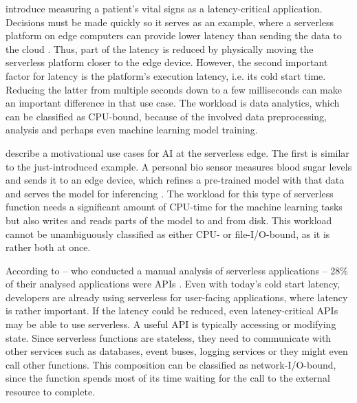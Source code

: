 \begin{description}[style=multiline, leftmargin=2.5cm, font=\bfseries]

    \item[Vital Signs Analysis] \citeauthor{Nastic2017} introduce measuring a patient's vital signs as a latency-critical application. Decisions must be made quickly so it serves as an example, where a serverless platform on edge computers can provide lower latency than sending the data to the cloud \cite{Nastic2017}. Thus, part of the latency is reduced by physically moving the serverless platform closer to the edge device. However, the second important factor for latency is the platform's execution latency, i.e. its cold start time. Reducing the latter from multiple seconds down to a few milliseconds can make an important difference in that use case. The workload is data analytics, which can be classified as CPU-bound, because of the involved data preprocessing, analysis and perhaps even machine learning model training.
    \item[Edge AI] \citeauthor{Rausch2019} describe a motivational use cases for AI at the serverless edge. The first is similar to the just-introduced example. A personal bio sensor measures blood sugar levels and sends it to an edge device, which refines a pre-trained model with that data and serves the model for inferencing \cite{Rausch2019}. The workload for this type of serverless function needs a significant amount of CPU-time for the machine learning tasks but also writes and reads parts of the model to and from disk. This workload cannot be unambiguously classified as either CPU- or file-I/O-bound, as it is rather both at once.
    \item[APIs] According to \citeauthor{Eismann2021a} -- who conducted a manual analysis of serverless applications -- 28\% of their analysed applications were APIs \cite{Eismann2021a}. Even with today's cold start latency, developers are already using serverless for user-facing applications, where latency is rather important. If the latency could be reduced, even latency-critical APIs may be able to use serverless. A useful API is typically accessing or modifying state. Since serverless functions are stateless, they need to communicate with other services such as databases, event buses, logging services or they might even call other functions. This composition can be classified as network-I/O-bound, since the function spends most of its time waiting for the call to the external resource to complete.

\end{description}


